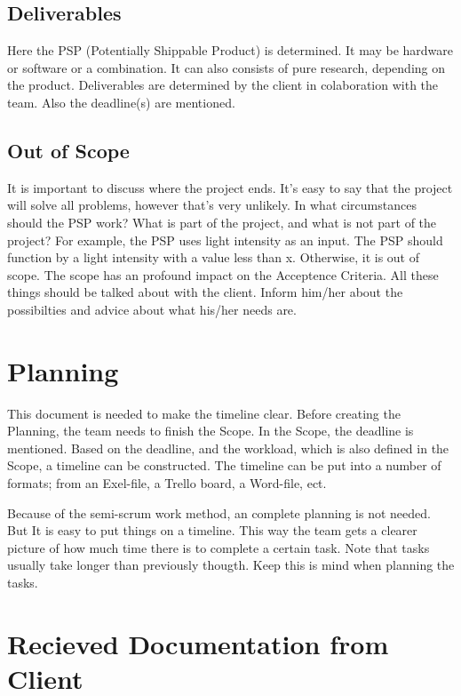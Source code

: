 \documentclass[10pt]{report}
\begin{document}
\subsection{Deliverables}

Here the PSP (Potentially Shippable Product) is determined. It may be hardware or software or a combination. It can also consists of pure research, depending on the product. Deliverables are determined by the client in colaboration with the team. Also the deadline(s) are mentioned.

\subsection{Out of Scope}

It is important to discuss where the project ends. It's easy to say that the project will solve all problems, however that's very unlikely. In what circumstances should the PSP work? What is part of the project, and what is not part of the project? For example, the PSP uses light intensity as an input. The PSP should function by a light intensity with a value less than x. Otherwise, it is out of scope. The scope has an profound impact on the Acceptence Criteria. All these things should be talked about with the client. Inform him/her about the possibilties and advice about what his/her needs are.

\newpage

\section{Planning}

This document is needed to make the timeline clear. Before creating the Planning, the team needs to finish the Scope. In the Scope, the deadline is mentioned. Based on the deadline, and the workload, which is also defined in the Scope, a timeline can be constructed. The timeline can be put into a number of formats; from an Exel-file, a Trello board, a Word-file, ect.

Because of the semi-scrum work method, an complete planning is not needed. But It is easy to put things on a timeline. This way the team gets a clearer picture of how much time there is to complete a certain task. Note that tasks usually take longer than previously thougth. Keep this is mind when planning the tasks.

\newpage

\section{Recieved Documentation from Client}
\end{document}
